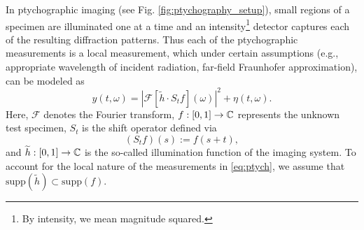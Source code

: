 In ptychographic imaging (see Fig.
\ref{fig:ptychography_setup}), small regions of a specimen are
illuminated one at a time and an intensity\footnote{By intensity,
we mean magnitude squared.} detector captures each of the
resulting  diffraction patterns. Thus each of the ptychographic
measurements is a local measurement, which under certain
assumptions (e.g., appropriate wavelength of incident radiation,
far-field Fraunhofer approximation), can be modeled as
\cite{Dierolf2008Ptych,Goodman2005IntroFourierOptics}%
%
\begin{equation}
    y(t, \omega) = \left \vert \mathcal F [ \widetilde h \cdot S_t f ] (\omega) 
       \right \vert^2 + \eta(t, \omega) .\label{eq:ptych}
\end{equation} 
%
%
Here, $\mathcal F$ denotes the Fourier transform, $f : [0, 1] \to \mathbb{C}$ represents
the unknown test specimen, $S_t$ is the shift operator defined
via $$(S_t f)(s) := f(s + t),$$ and $\widetilde h : [0, 1] \to \mathbb{C}$ is the so-called
illumination function %
\cite{arXiv:1105.5628_MarchesiniEtAl}
of the imaging system. %
To account for the local nature of the measurements in
\eqref{eq:ptych}, we assume that $\text{supp}(\widetilde h)
\subset \text{supp} (f)$.

